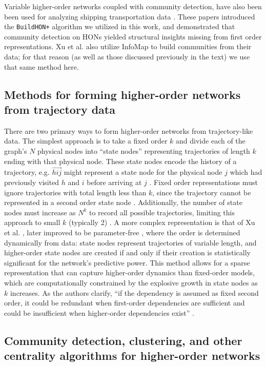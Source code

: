 \documentclass[sigconf]{acmart}
\begin{document}
Variable higher-order networks coupled with community detection, have also been been used for analyzing shipping transportation data \cite{Xu2016, Xu2017}. These papers introduced the \texttt{BuildHON+} algorithm we utilized in this work, and demonstrated that community detection on HONs yielded structural insights missing from first order representations. Xu et al. also utilize InfoMap to build communities from their data; for that reason (as well as those discussed previously in the text) we use that same method here\cite{Rosvall2014}.

\subsection{Methods for forming higher-order networks from trajectory data}

There are two primary ways to form higher-order networks from trajectory-like data. The simplest approach is to take a fixed order $k$ and divide each of the graph's $N$ physical nodes into ``state nodes'' representing trajectories of length $k$ ending with that physical node. These state nodes encode the history of a trajectory, e.g. $\vec{hij}$ might represent a state node for the physical node $j$ which had previously visited $h$ and $i$ before arriving at $j$ \cite{Rosvall2014}. Fixed order representations must ignore trajectories with total length less than $k$, since the trajectory cannot be represented in a second order state node \cite{Rosvall2014}. Additionally, the number of state nodes must increase as $N^k$ to record all possible trajectories, limiting this approach to small $k$ (typically 2) \cite{Rosvall2014}. A more complex representation is that of Xu et al. \cite{Xu2016}, later improved to be parameter-free \cite{Xu2017}, where the order is determined dynamically from data: state nodes represent trajectories of variable length, and higher-order state nodes are created if and only if their creation is statistically significant for the network's predictive power. This method allows for a sparse representation that can capture higher-order dynamics than fixed-order models, which are computationally constrained by the explosive growth in state nodes as $k$ increases. As the authors clarify, ``if the dependency is assumed as fixed second order, it could be redundant when first-order dependencies are sufficient and could be insufficient when higher-order dependencies exist'' \cite{Xu2016}.

\subsection{Community detection, clustering, and other centrality algorithms for higher-order networks} 
\end{document}
